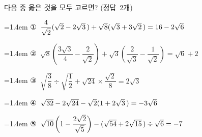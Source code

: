 다음 중 옳은 것을 모두 고르면? \mbox{(정답 2개)}
\par\medskip\par\noindent\hangindent=1.4em {\small ①}\ $\dfrac{4}{\sqrt{2}}(\sqrt{2}-2\sqrt{3}\mkern3mu )+\sqrt{8}(\sqrt{3}+3\sqrt{2}\mkern3mu )=16-2\sqrt{6}$\par\noindent\hangindent=1.4em {\small ②}\ $\sqrt{8}\left(\dfrac{3\sqrt{3}}{4}-\dfrac{2}{\sqrt{2}}\right)+\sqrt{3}\left(\dfrac{2}{\sqrt{3}}-\dfrac{1}{\sqrt{2}}\right)=\sqrt{6}+2$\par\noindent\hangindent=1.4em {\small ③}\ $\sqrt{\dfrac{3}{8}}\div\sqrt{\dfrac{1}{2}}+\sqrt{24}\times\dfrac{\sqrt{2}}{8}=2\sqrt{3}$\par\noindent\hangindent=1.4em {\small ④}\ $\sqrt{32}-2\sqrt{24}-\sqrt{2}(1+2\sqrt{3}\mkern3mu )=-3\sqrt{6}$\par\noindent\hangindent=1.4em {\small ⑤}\ $\sqrt{10}\left(1-\dfrac{2\sqrt{2}}{\sqrt{5}}\right)-(\sqrt{54}+2\sqrt{15}\mkern3mu )\div\sqrt{6}=-7$\par\medskip
